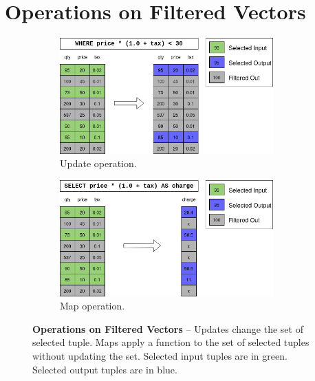 \documentclass[12pt]{cmuthesis}
\begin{document}
\section{Operations on Filtered Vectors}
\begin{figure}[t!]
\centering
\hspace*{\fill}%
\begin{subfigure}{.8\textwidth}
 \centering
 \includegraphics[width=0.9\textwidth]{images/UpdateIntro.png}
 \caption{Update operation.}
  \label{fig:update_intro}
\end{subfigure}%
\hspace*{\fill}%
\vspace*{8pt}%

\hspace*{\fill}%

\begin{subfigure}{.8\textwidth}
 \centering
 \includegraphics[width=0.9\textwidth]{images/MapIntro.png}
 \caption{Map operation.}
  \label{fig:map_intro}
\end{subfigure}
\caption{\textbf{Operations on Filtered Vectors} -- Updates change the set of selected tuple. Maps apply a function to the set of selected tuples without updating the set. Selected input tuples are in green. Selected output tuples are in blue.}
\label{fig:update_map_intro}
\end{figure}
\end{document}

